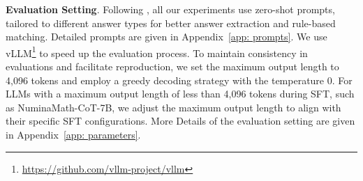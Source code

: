 \textbf{Evaluation Setting}.
Following \citet{OlympiadBench2024He, OlympicArena2024huang}, all our experiments use zero-shot prompts, tailored to different answer types for better answer extraction and rule-based matching.
Detailed prompts are given in Appendix~\ref{app: prompts}.
We use vLLM\footnote{\href{https://github.com/vllm-project/vllm}{https://github.com/vllm-project/vllm}} to speed up the evaluation process.
To maintain consistency in evaluations and facilitate reproduction, we set the maximum output length to 4,096 tokens and employ a greedy decoding strategy with the temperature 0.
For LLMs with a maximum output length of less than 4,096 tokens during SFT, such as NuminaMath-CoT-7B, we adjust the maximum output length to align with their specific SFT configurations.
More Details of the evaluation setting are given in Appendix~\ref{app: parameters}.







